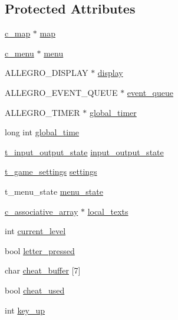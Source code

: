 \subsection*{Protected Attributes}
\begin{DoxyCompactItemize}
\item 
\hyperlink{classc__map}{c\-\_\-map} $\ast$ \hyperlink{classc__game_a64da959df63b76ac18b0f25ad707db9f}{map}
\item 
\hyperlink{classc__menu}{c\-\_\-menu} $\ast$ \hyperlink{classc__game_ad4535e427b20e3fe386a0add7fa68afa}{menu}
\item 
A\-L\-L\-E\-G\-R\-O\-\_\-\-D\-I\-S\-P\-L\-A\-Y $\ast$ \hyperlink{classc__game_aa9c205a51cef10ec977e732c750e64b8}{display}
\item 
A\-L\-L\-E\-G\-R\-O\-\_\-\-E\-V\-E\-N\-T\-\_\-\-Q\-U\-E\-U\-E $\ast$ \hyperlink{classc__game_ab0ea00eb13e7bda75d2e217d98f4a289}{event\-\_\-queue}
\item 
A\-L\-L\-E\-G\-R\-O\-\_\-\-T\-I\-M\-E\-R $\ast$ \hyperlink{classc__game_ae2ac3ae12fba38e6626979b941406dbe}{global\-\_\-timer}
\item 
long int \hyperlink{classc__game_afd3e4b96f2e16848b1a81a8349ef9c85}{global\-\_\-time}
\item 
\hyperlink{structt__input__output__state}{t\-\_\-input\-\_\-output\-\_\-state} \hyperlink{classc__game_ad2ad5aa7d756f89bb53359d4c74db8da}{input\-\_\-output\-\_\-state}
\item 
\hyperlink{structt__game__settings}{t\-\_\-game\-\_\-settings} \hyperlink{classc__game_aa52e67cd5e61fd952434abd0b761136c}{settings}
\item 
t\-\_\-menu\-\_\-state \hyperlink{classc__game_a2d4311ca959ebad56e79e0162cf7a9c0}{menu\-\_\-state}
\item 
\hyperlink{classc__associative__array}{c\-\_\-associative\-\_\-array} $\ast$ \hyperlink{classc__game_ae4e944fab107e1aa58676c40684ef634}{local\-\_\-texts}
\item 
int \hyperlink{classc__game_a6279909358cd7d29a187ffcee9d621d8}{current\-\_\-level}
\item 
bool \hyperlink{classc__game_acb143b7fb56f8be0caf0826f4865aee8}{letter\-\_\-pressed}
\item 
char \hyperlink{classc__game_ab13d9ba9025a290671b663f4163ada9c}{cheat\-\_\-buffer} \mbox{[}7\mbox{]}
\item 
bool \hyperlink{classc__game_a818510abc8ca17bab74a2e9e02897015}{cheat\-\_\-used}
\item 
int \hyperlink{classc__game_afe75cb5007878208a9ba456438b1cd3e}{key\-\_\-up}

\end{DoxyCompactItemize}
